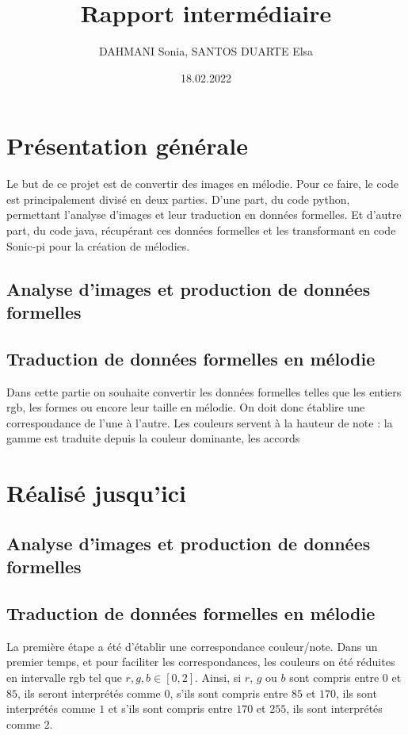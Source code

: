 \documentclass{article}
\title{Rapport intermédiaire}
\author{DAHMANI Sonia, SANTOS DUARTE Elsa}
\date{18.02.2022}
\begin{document}
	
\maketitle

\section{Présentation générale}
	Le but de ce projet est de convertir des images en mélodie. Pour ce faire, le code est principalement divisé en deux parties. D'une part, du code python, permettant l'analyse d'images et leur traduction en données formelles. Et d'autre part, du code java, récupérant ces données formelles et les transformant en code Sonic-pi pour la création de mélodies.
	\subsection{Analyse d'images et production de données formelles}
	\subsection{Traduction de données formelles en mélodie}
		Dans cette partie on souhaite convertir les données formelles telles que les entiers rgb, les formes ou encore leur taille en mélodie. On doit donc établire une correspondance de l'une à l'autre. Les couleurs servent à la hauteur de note : la gamme est traduite depuis la couleur dominante, les accords 
\section{Réalisé jusqu'ici}
	\subsection{Analyse d'images et production de données formelles}
	\subsection{Traduction de données formelles en mélodie}
		La première étape a été d'établir une correspondance couleur/note. Dans un premier temps, et pour faciliter les correspondances, les couleurs on été réduites en intervalle rgb tel que $r,g,b \in [0,2]$. Ainsi, si $r$, $g$ ou $b$ sont compris entre $0$ et $85$, ils seront interprétés comme $0$, s'ils sont compris entre $85$ et $170$, ils sont interprétés comme $1$ et s'ils sont compris entre $170$ et $255$, ils sont interprétés comme $2$. 
\end{document}
